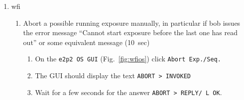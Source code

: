\documentclass[11pt,fleqn]{book} %
\begin{document}
\begin{enumerate}
\begin{enumerate}
\begin{enumerate}
       \end{enumerate}
       \item Ensure only one \gls{bob} is running
         \begin{enumerate}
           \item Find all \glspl{bob} (\texttt{ps gaux | grep bob})
           \item \texttt{kill} them
           \item launch a new \gls{bob}.
         \end{enumerate}
       \item \textit{(\gls{grond})} Restart \gls{fiera} (see ~\ref{restartfiera}).
       \item \textit{(\gls{grond})} Restart \gls{grond}.
         \begin{enumerate}
           \item Type \texttt{grinsStop}
           \item Type \texttt{grinsStart}
           \item In \texttt{GROND Control} panel, put instrument \texttt{ONLINE}.
         \end{enumerate}
       \item \textit{(\gls{grond})} Reboot \gls{grond}.
       \item \textit{(\gls{grond})} If the GROND control has many TCS-related fields with gray background or the error says something about the FITS keyword TELESCOP, a last resort reboot of GROND may be needed. \textbf{BUT} in case of the first scenario, take a separate exposure with \gls{fiera} (in the control panel) first and check if these fields turn back to their usual color.
     \end{enumerate}
  \item\label{list:wfiexpocrash} \gls{wfi}
    \begin{enumerate}
      \item Abort a possible running exposure manually, in particular if \gls{bob} issues the error message
             ``Cannot start exposure before the last one has read out'' or some
             equivalent message (10~sec)
        \begin{enumerate}
           \item On the \texttt{e2p2 OS GUI} (Fig.~\ref{fig:wfios}) click \texttt{Abort Exp./Seq.}
           \item The GUI should display the text \texttt{ABORT    > INVOKED}
           \item Wait for a few seconds for the answer \texttt{ABORT    > REPLY/ L   OK}.

\end{enumerate}
\end{enumerate}
\end{enumerate}
\end{document}
